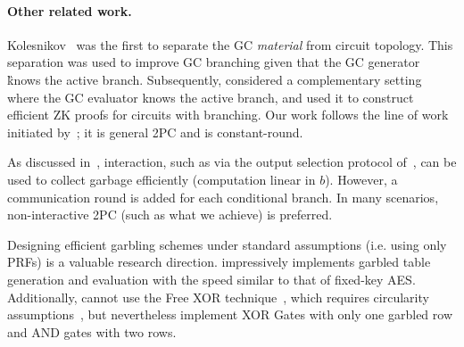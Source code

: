 \paragraph{Other related work.}


Kolesnikov~\cite{AC:Kolesnikov18} was the first to separate the GC
{\em material} from circuit topology.
This separation was used to improve GC branching
given that the GC generator \G knows the active branch.
Subsequently, \cite{EC:HeaKol20} considered a complementary setting
where the GC evaluator \E knows the active branch, and used it to
construct efficient ZK proofs for circuits with branching.  Our work
follows the line of work initiated
by~\cite{AC:Kolesnikov18,EC:HeaKol20}; it is general 2PC and is
constant-round.

As discussed in~\HK, interaction, such as via the output
selection protocol of~\cite{AC:Kolesnikov18}, can be used to collect
garbage efficiently (computation linear in $b$).
However, a communication round is added for each conditional branch.
In many scenarios, non-interactive 2PC (such as what we achieve) is preferred.

Designing efficient garbling schemes under standard assumptions (i.e.
using only PRFs) is a valuable research direction.
\cite{CCS:GLNP15} impressively implements garbled table
generation and evaluation with the speed similar to that of
fixed-key AES.
Additionally, \cite{CCS:GLNP15} cannot use the Free XOR technique~\cite{ICALP:KolSch08}, which requires circularity
assumptions~\cite{TCC:CKKZ12}, but nevertheless implement XOR Gates
with only one garbled row and AND gates with two rows.
